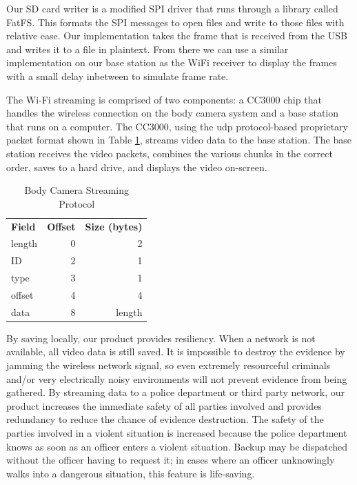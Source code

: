 \documentclass[12pt]{article}
\begin{document}
Our SD card writer is a modified SPI driver that runs through a library called
FatFS. This formats the SPI messages to open files and write to those files
with relative ease. Our implementation takes the frame that is received from
the USB and writes it to a file in plaintext. From there we can use a similar
implementation on our base station as the WiFi receiver to display the frames
with a small delay inbetween to simulate frame rate. 

The Wi-Fi streaming is comprised of two components: a CC3000 chip that handles
the wireless connection on the body camera system and a base station that runs
on a computer. The CC3000, using the \gls{udp} protocol-based proprietary
packet format shown in Table \ref{tab:packet_format}, streams video data to the
base station.  The base station receives the video packets, combines the
various chunks in the correct order, saves to a hard drive, and displays the
video on-screen.

\begin{table}[h]
    \centering
    \caption{Body Camera Streaming Protocol}
    \begin{tabular}{lrr}
        \textbf{Field} & \textbf{Offset} & \textbf{Size (bytes)}\\
        length & 0 & 2\\
        ID & 2 & 1\\
        type & 3 & 1\\
        offset & 4 & 4\\
        data & 8 & length\\
    \end{tabular}
    \label{tab:packet_format}
\end{table}

By saving locally, our product provides resiliency. When a network is not
available, all video data is still saved. It is impossible to destroy the
evidence by jamming the wireless network signal, so even extremely resourceful
criminals and/or very electrically noisy environments will not prevent evidence
from being gathered. By streaming data to a police department or third party
network, our product increases the immediate safety of all parties involved and
provides redundancy to reduce the chance of evidence destruction. The safety of
the parties involved in a violent situation is increased because the police
department knows as soon as an officer enters a violent situation. Backup may
be dispatched without the officer having to request it; in cases where an
officer unknowingly walks into a dangerous situation, this feature is
life-saving.
\end{document}
